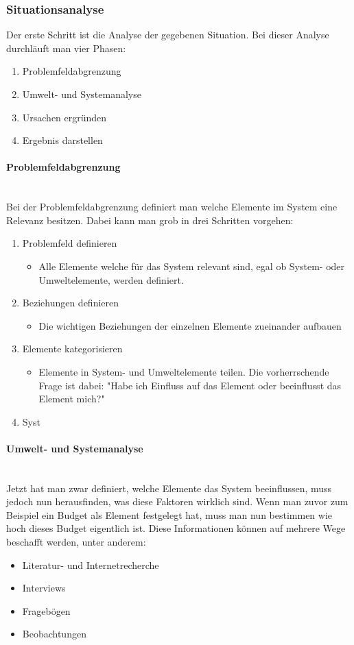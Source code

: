 \documentclass{article}
\newcommand{\paragraphlb}[1]{\paragraph{#1}\mbox{}\\}
\begin{document}
	\subsubsection{Situationsanalyse}
	Der erste Schritt ist die Analyse der gegebenen Situation. Bei dieser Analyse durchläuft man vier Phasen:
	\begin{enumerate}
		\item{Problemfeldabgrenzung}
		\item{Umwelt- und Systemanalyse}
		\item{Ursachen ergründen}
		\item{Ergebnis darstellen}
	\end{enumerate}
	\paragraphlb{Problemfeldabgrenzung}
	Bei der Problemfeldabgrenzung definiert man welche Elemente im System eine Relevanz besitzen. Dabei kann man grob in drei Schritten vorgehen:
	\begin{enumerate}
		\item{Problemfeld definieren}
		\begin{itemize}
			\item{Alle Elemente welche für das System relevant sind, egal ob System- oder Umweltelemente, werden definiert.}
		\end{itemize}
		\item{Beziehungen definieren}
		\begin{itemize}
			\item{Die wichtigen Beziehungen der einzelnen Elemente zueinander aufbauen}
		\end{itemize}
		\item{Elemente kategorisieren}
		\begin{itemize}
			\item{Elemente in System- und Umweltelemente teilen. Die vorherrschende Frage ist dabei: "Habe ich Einfluss auf das Element oder beeinflusst das Element mich?"}
		\end{itemize}
		\item{Syst}
	\end{enumerate}
	\paragraphlb{Umwelt- und Systemanalyse}
	Jetzt hat man zwar definiert, welche Elemente das System beeinflussen, muss jedoch nun herausfinden, was diese Faktoren wirklich sind. Wenn man zuvor zum Beispiel ein Budget als Element festgelegt hat, muss man nun bestimmen wie hoch dieses Budget eigentlich ist. Diese Informationen können auf mehrere Wege beschafft werden, unter anderem:
	\begin{itemize}
		\item{Literatur- und Internetrecherche}
		\item{Interviews}
		\item{Fragebögen}
		\item{Beobachtungen}
	\end{itemize}
\end{document}
